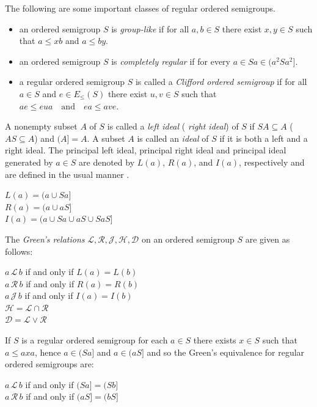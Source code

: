 \documentclass[12pt,a4paper]{amsart}
\theoremstyle{plain}
\theoremstyle{definition}
\begin{document}
The following are some important classes of regular ordered semigroups.
\begin{itemize}
	\item an ordered semigroup $S$ is \textit{group-like} if for all $a,b \in S$ there exist $x,y \in S$ such that 	$a \leq xb$ and $a \leq by$.
	\item an ordered semigroup $S$ is \textit{completely regular} if for every $a \in S
	a \in (a^{2}Sa^{2}].$
	\item a regular ordered semigroup $S$ is called a \textit{Clifford ordered semigroup} if for all $a \in S$ and $e \in E_{\leq}(S)$ there exist $u,v \in S$ such that
	$ae \leq eua \quad \text{and} \quad ea \leq ave.$
	
\end{itemize} 
A nonempty subset $A$ of $S$ is called a \textit{left ideal} ( \textit{right ideal}) of $S$ if
$SA \subseteq A$ ($AS \subseteq A$) and $(A]=A$.
A subset $A$ is called an \textit{ideal} of $S$ if it is both a left and a right ideal.
The principal left ideal, principal right ideal and principal ideal generated by $a \in S$ are denoted by $L(a)$, $R(a)$, and $I(a)$, respectively and are defined in the usual manner \cite{kahaloideal}.
\begin{center}
	$ L(a) = (a \cup Sa] $\\
	$ R(a) = (a \cup aS] $\\
	$ I(a) = (a \cup Sa \cup aS \cup SaS] $\\
	
\end{center}
The \textit{Green's relations}  $ \mathscr{L} ,\mathscr{R}, \mathscr{J}, \mathscr{H}, \mathscr{D}  $ on an ordered semigroup $ S $ are given as follows:
\begin{center}
	$ a\,\mathscr{L} \,b $ if and only if $ L(a) = L(b) $\\
	$ a\,\mathscr{R} \,b $ if and only if $ R(a) = R(b) $\\
	$ a\,\mathscr{J} \,b $ if and only if $ I(a) = I(b) $\\
	$ \mathscr{H} = \mathscr{L} \cap \mathscr{R} $\\
	$ \mathscr{D} = \mathscr{L} \vee \mathscr{R} $
\end{center}
If $ S $ is a regular ordered  semigroup for each $ a \in{S} $ there exists $ x \in{S} $ such that $ a \leq axa$, hence $ a \in (Sa] $ and 
$ a \in (aS] $ and so the Green's equivalence for regular ordered semigroups are:
\begin{center}
	$ a\,\mathscr{L} \,b $ if and only if $ (Sa]  = (Sb] $\\
	$ a\,\mathscr{R} \,b $ if and only if $ (aS]  = (bS] $\\
\end{center}
\end{document}
